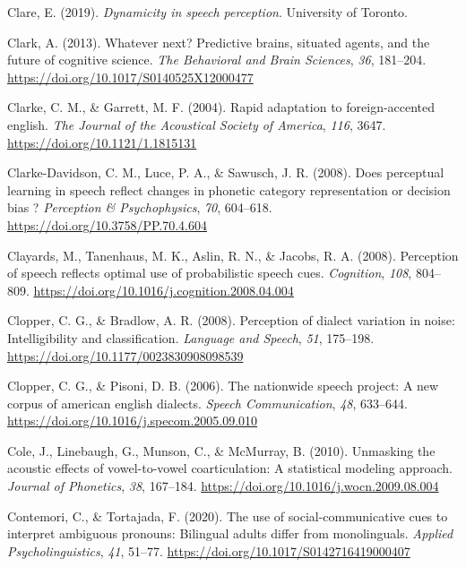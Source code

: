 \documentclass[
  11pt,
  english,
  man,floatsintext]{apa6}
\newlength{\cslhangindent}
\newlength{\cslentryspacingunit} %
\newenvironment{CSLReferences}[2] %
 {%
  \setlength{\parindent}{0pt}
  \ifodd #1
  \let\oldpar\par
  \def\par{\hangindent=\cslhangindent\oldpar}
  \fi
  \setlength{\parskip}{#2\cslentryspacingunit}
 }%
 {}
\begin{document}
\begin{CSLReferences}{1}{0}
\leavevmode{}%
Clare, E. (2019). \emph{Dynamicity in speech perception}. University of Toronto.

\leavevmode{}%
Clark, A. (2013). Whatever next? Predictive brains, situated agents, and the future of cognitive science. \emph{The Behavioral and Brain Sciences}, \emph{36}, 181--204. \url{https://doi.org/10.1017/S0140525X12000477}

\leavevmode{}%
Clarke, C. M., \& Garrett, M. F. (2004). Rapid adaptation to foreign-accented english. \emph{The Journal of the Acoustical Society of America}, \emph{116}, 3647. \url{https://doi.org/10.1121/1.1815131}

\leavevmode{}%
Clarke-Davidson, C. M., Luce, P. A., \& Sawusch, J. R. (2008). Does perceptual learning in speech reflect changes in phonetic category representation or decision bias ? \emph{Perception \& Psychophysics}, \emph{70}, 604--618. \url{https://doi.org/10.3758/PP.70.4.604}

\leavevmode{}%
Clayards, M., Tanenhaus, M. K., Aslin, R. N., \& Jacobs, R. A. (2008). Perception of speech reflects optimal use of probabilistic speech cues. \emph{Cognition}, \emph{108}, 804--809. \url{https://doi.org/10.1016/j.cognition.2008.04.004}

\leavevmode{}%
Clopper, C. G., \& Bradlow, A. R. (2008). Perception of dialect variation in noise: Intelligibility and classification. \emph{Language and Speech}, \emph{51}, 175--198. \url{https://doi.org/10.1177/0023830908098539}

\leavevmode{}%
Clopper, C. G., \& Pisoni, D. B. (2006). The nationwide speech project: A new corpus of american english dialects. \emph{Speech Communication}, \emph{48}, 633--644. \url{https://doi.org/10.1016/j.specom.2005.09.010}

\leavevmode{}%
Cole, J., Linebaugh, G., Munson, C., \& McMurray, B. (2010). Unmasking the acoustic effects of vowel-to-vowel coarticulation: A statistical modeling approach. \emph{Journal of Phonetics}, \emph{38}, 167--184. \url{https://doi.org/10.1016/j.wocn.2009.08.004}

\leavevmode{}%
Contemori, C., \& Tortajada, F. (2020). The use of social-communicative cues to interpret ambiguous pronouns: Bilingual adults differ from monolinguals. \emph{Applied Psycholinguistics}, \emph{41}, 51--77. \url{https://doi.org/10.1017/S0142716419000407}


\end{CSLReferences}
\end{document}
